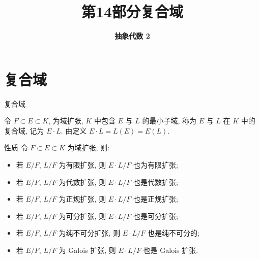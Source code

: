 \everymath{\displaystyle}



\title[复合域]{\texorpdfstring{\LARGE \bfseries 第14部分\quad 复合域}{第14部分 复合域}}
\author[抽象代数 2]{\Large \bfseries 抽象代数 2}
\date{}





\begin{frame}

\titlepage %

\end{frame}


\section[复合域]{复合域}


\begin{frame}{复合域}

令 $F \subset E \subset K$, 为域扩张, $K$ 中包含 $E$ 与 $L$ 的最小子域,
称为 $E$ 与 $L$ 在 $K$ 中的复合域, 记为 $E \cdot L$.
由定义 $E \cdot L = L(E) = E(L)$.

\pause

\begin{block}{性质}
令 $F \subset E \subset K$ 为域扩张, 则:
\begin{itemize}
\item {} 若 $E/F$, $L/F$ 为有限扩张, 则 $E \cdot L/F$ 也为有限扩张;
\item {} 若 $E/F$, $L/F$ 为代数扩张, 则 $E \cdot L/F$ 也是代数扩张;
\item {} 若 $E/F$, $L/F$ 为正规扩张, 则 $E \cdot L/F$ 也是正规扩张;
\item {} 若 $E/F$, $L/F$ 为可分扩张, 则 $E \cdot L/F$ 也是可分扩张;
\item {} 若 $E/F$, $L/F$ 为纯不可分扩张, 则 $E \cdot L/F$ 也是纯不可分的;
\item {} 若 $E/F$, $L/F$ 为 Galois 扩张, 则 $E \cdot L/F$ 也是 Galois 扩张.
\end{itemize}
\end{block}

\end{frame}

